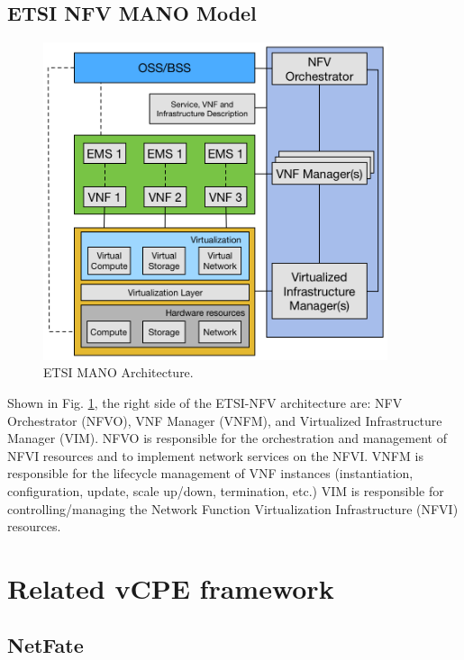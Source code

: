 \subsection{ETSI NFV MANO Model}

\begin{figure}[!t]
\centering
\includegraphics[width=0.9\textwidth]{./fig/etsi_nfv_architecture}
\caption{ETSI MANO Architecture. \cite{etsi-nfv-archi}}
\label{fig:etsi_nfv_architecture}
\end{figure}

Shown in Fig. \ref{fig:etsi_nfv_architecture}, the right side of the ETSI-NFV architecture \cite{etsi-nfv-archi} are: NFV Orchestrator (NFVO), VNF Manager (VNFM), and Virtualized Infrastructure Manager (VIM). NFVO is responsible for the orchestration and management of NFVI resources and to implement network services on the NFVI. VNFM is responsible for the lifecycle management of VNF instances (instantiation, configuration, update, scale up/down, termination, etc.) VIM is responsible for controlling/managing the Network Function Virtualization Infrastructure (NFVI) resources.





\section{Related vCPE framework} \label{sec:related_vcpe}
\subsection{NetFate}

